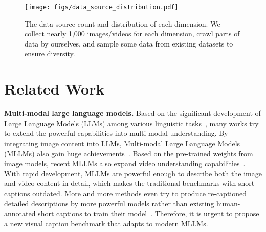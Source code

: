 \begin{figure*}[!t]
\centering
\texttt{[image: figs/data\_source\_distribution.pdf]}
\vspace{-8pt}
\caption{The data source count and distribution of each dimension. We collect nearly 1,000 images/videos for each dimension, crawl parts of data by ourselves, and sample some data from existing datasets to ensure diversity.}
\label{fig:data_source}
\end{figure*}

\section{Related Work}
\noindent\textbf{Multi-modal large language models.}
Based on the significant development of Large Language Models (LLMs) among various linguistic tasks~\cite{gpt3, vicuna, qwen2.5, llama3}, many works try to extend the powerful capabilities into multi-modal understanding. By integrating image content into LLMs, Multi-modal Large Language Models (MLLMs) also gain huge achievements~\cite{llava, llava1.5, qwenvl, minigpt4, llavanext, internvl, gpt4v}. Based on the pre-trained weights from image models, recent MLLMs also expand video understanding capabilities~\cite{llavanextvideo, llavaov, llavavideo, qwen2vl, internvl2.5, nvila, videollama3, qwen2.5vl}. With rapid development, MLLMs are powerful enough to describe both the image and video content in detail, which makes the traditional benchmarks with short captions outdated. More and more methods even try to produce re-captioned detailed descriptions by more powerful models rather than existing human-annotated short captions to train their model~\cite{llavaov, videollama3}. Therefore, it is urgent to propose a new visual caption benchmark that adapts to modern MLLMs.

